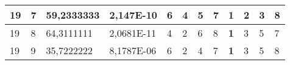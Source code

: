 \documentclass[conference]{IEEEtran}
\begin{document}
\begin{table*}[]
\begin{tabular}{|llll|llllllll|}
\multicolumn{1}{|l|}{19}                                                    & \multicolumn{1}{l|}{7}                                                        & \multicolumn{1}{l|}{59,2333333}                                                   & 2,147E-10                      & \multicolumn{1}{l|}{6}                                                  & \multicolumn{1}{l|}{4}                                                  & \multicolumn{1}{l|}{5}                                                  & \multicolumn{1}{l|}{7}                                                  & \multicolumn{1}{l|}{\textbf{1}}                                         & \multicolumn{1}{l|}{2}                                                  & \multicolumn{1}{l|}{3}                                                  & 8                          \\ \hline
\multicolumn{1}{|l|}{19}                                                    & \multicolumn{1}{l|}{8}                                                        & \multicolumn{1}{l|}{64,3111111}                                                   & 2,0681E-11                     & \multicolumn{1}{l|}{4}                                                  & \multicolumn{1}{l|}{2}                                                  & \multicolumn{1}{l|}{6}                                                  & \multicolumn{1}{l|}{8}                                                  & \multicolumn{1}{l|}{\textbf{1}}                                         & \multicolumn{1}{l|}{3}                                                  & \multicolumn{1}{l|}{5}                                                  & 7                          \\ \hline
\multicolumn{1}{|l|}{19}                                                    & \multicolumn{1}{l|}{9}                                                        & \multicolumn{1}{l|}{35,7222222}                                                   & 8,1787E-06                     & \multicolumn{1}{l|}{6}                                                  & \multicolumn{1}{l|}{2}                                                  & \multicolumn{1}{l|}{4}                                                  & \multicolumn{1}{l|}{7}                                                  & \multicolumn{1}{l|}{\textbf{1}}                                         & \multicolumn{1}{l|}{3}                                                  & \multicolumn{1}{l|}{5}                                                  & 8                          \\ \hline

\end{tabular}
\end{table*}
\end{document}
